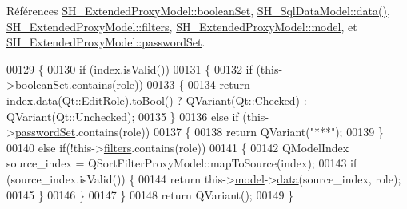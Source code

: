 Références \hyperlink{classSH__ExtendedProxyModel_a7dd9cf1dd153b98220d217e9be1f0916}{S\-H\-\_\-\-Extended\-Proxy\-Model\-::boolean\-Set}, \hyperlink{classSH__SqlDataModel_aa4664329d52c2d2cba2bacc42fa1a564}{S\-H\-\_\-\-Sql\-Data\-Model\-::data()}, \hyperlink{classSH__ExtendedProxyModel_a99a5c4c6b9d125c87f048c76d22278d3}{S\-H\-\_\-\-Extended\-Proxy\-Model\-::filters}, \hyperlink{classSH__ExtendedProxyModel_a8c8b8930c6b1abd9bbb1dce1fdc9690b}{S\-H\-\_\-\-Extended\-Proxy\-Model\-::model}, et \hyperlink{classSH__ExtendedProxyModel_a9616e7be442b560e260e1db9034143bc}{S\-H\-\_\-\-Extended\-Proxy\-Model\-::password\-Set}.


\begin{DoxyCode}
00129 \{
00130     \textcolor{keywordflow}{if} (index.isValid())
00131     \{
00132         \textcolor{keywordflow}{if} (this->\hyperlink{classSH__ExtendedProxyModel_a7dd9cf1dd153b98220d217e9be1f0916}{booleanSet}.contains(role))
00133         \{
00134             \textcolor{keywordflow}{return} index.data(Qt::EditRole).toBool() ? QVariant(Qt::Checked) : QVariant(Qt::Unchecked);
00135         \}
00136         \textcolor{keywordflow}{else} \textcolor{keywordflow}{if} (this->\hyperlink{classSH__ExtendedProxyModel_a9616e7be442b560e260e1db9034143bc}{passwordSet}.contains(role))
00137         \{
00138             \textcolor{keywordflow}{return} QVariant(\textcolor{stringliteral}{"***"});
00139         \}
00140         \textcolor{keywordflow}{else} \textcolor{keywordflow}{if}(!this->\hyperlink{classSH__ExtendedProxyModel_a99a5c4c6b9d125c87f048c76d22278d3}{filters}.contains(role))
00141         \{
00142             QModelIndex source\_index = QSortFilterProxyModel::mapToSource(index);
00143             \textcolor{keywordflow}{if} (source\_index.isValid()) \{
00144                 \textcolor{keywordflow}{return} this->\hyperlink{classSH__ExtendedProxyModel_a8c8b8930c6b1abd9bbb1dce1fdc9690b}{model}->\hyperlink{classSH__SqlDataModel_aa4664329d52c2d2cba2bacc42fa1a564}{data}(source\_index, role);
00145             \}
00146         \}
00147     \}
00148     \textcolor{keywordflow}{return} QVariant();
00149 \}
\end{DoxyCode}
